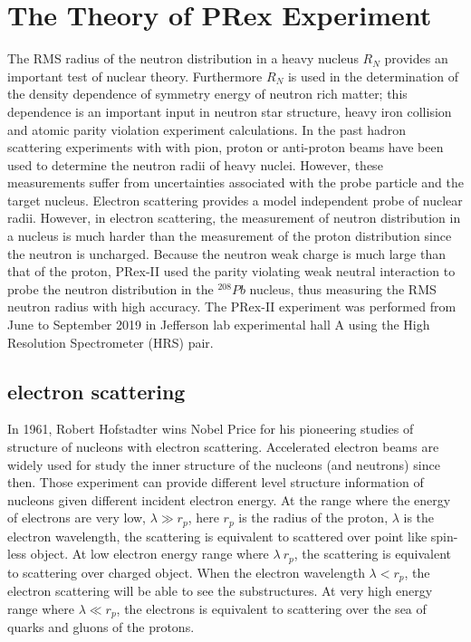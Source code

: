 \chapter{The Theory of PRex Experiment}

The RMS radius of the  neutron distribution in a heavy nucleus  $R_N$ provides an important test of nuclear theory. Furthermore   $R_N$ is used in the determination of  the density dependence of symmetry energy of neutron rich matter; this dependence is an  important input in   neutron star structure, heavy iron collision and atomic parity violation experiment calculations. In the past hadron scattering experiments with with pion, proton or anti-proton beams have been used to determine the neutron radii of heavy nuclei. However, these measurements suffer from uncertainties associated with the probe particle and the target nucleus. Electron scattering provides a model independent probe of nuclear radii.  However, in electron scattering, the measurement of neutron distribution in a nucleus  is much harder than the measurement of the proton distribution  since the neutron is uncharged. Because the  neutron weak charge is much large than that of the proton, PRex-II  used the parity violating weak neutral interaction to probe the neutron distribution in the  ${^{208}}Pb$ nucleus, thus measuring the RMS neutron radius with high  accuracy. The PRex-II experiment was performed from June to September 2019 in Jefferson lab experimental hall A using the High Resolution Spectrometer (HRS) pair. 

\section{electron scattering}

In 1961, Robert Hofstadter wins Nobel Price for his pioneering studies of structure of nucleons with  electron scattering. Accelerated electron beams are widely used for study the inner structure of the nucleons (and neutrons) since then. Those experiment can provide different level structure information of nucleons given different incident electron energy. At the range where the energy of electrons are very low, $\lambda \gg r_p$, here $r_p$ is the radius of the proton, $\lambda$ is the electron wavelength, the scattering is equivalent to scattered over point like spin-less object. At low electron energy range where $\lambda ~r_p$, the scattering is equivalent to scattering over charged object. When the electron wavelength $\lambda < r_p$, the electron scattering will be able to see the substructures. At very high energy range where $\lambda \ll r_p$, the electrons is equivalent to scattering over the sea of quarks and gluons of the protons. 

